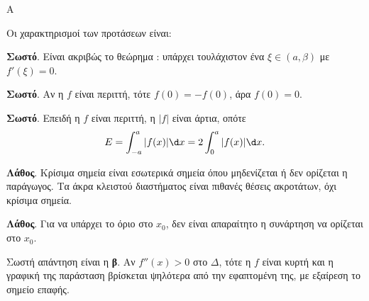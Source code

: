 \begin{thema}{Α}
\begin{erwthma}
\item {}

\item {}

\item {}

\item Οι χαρακτηρισμοί των προτάσεων είναι:
\begin{alist}
\item \textbf{Σωστό}. Είναι ακριβώς το θεώρημα : υπάρχει τουλάχιστον ένα $\xi\in(a,\beta)$ με $f'(\xi)=0$.
\item \textbf{Σωστό}. Αν η $f$ είναι περιττή, τότε $f(0)=-f(0)$, άρα $f(0)=0$.
\item \textbf{Σωστό}. Επειδή η $f$ είναι περιττή, η $|f|$ είναι άρτια, οπότε
\[ E=\dint_{-a}^{a}|f(x)|\d x=2\dint_0^a |f(x)|\d x. \]
\item \textbf{Λάθος}. Κρίσιμα σημεία είναι εσωτερικά σημεία όπου μηδενίζεται ή δεν ορίζεται η παράγωγος. Τα άκρα κλειστού διαστήματος είναι πιθανές θέσεις ακροτάτων, όχι κρίσιμα σημεία.
\item \textbf{Λάθος}. Για να υπάρχει το όριο στο $x_0$, δεν είναι απαραίτητο η συνάρτηση να ορίζεται στο $x_0$.
\end{alist}

\item Σωστή απάντηση είναι η \textbf{β}. Αν $f''(x)>0$ στο $\Delta$, τότε η $f$ είναι κυρτή και η γραφική της παράσταση βρίσκεται ψηλότερα από την εφαπτομένη της, με εξαίρεση το σημείο επαφής.
\end{erwthma}
\end{thema}

